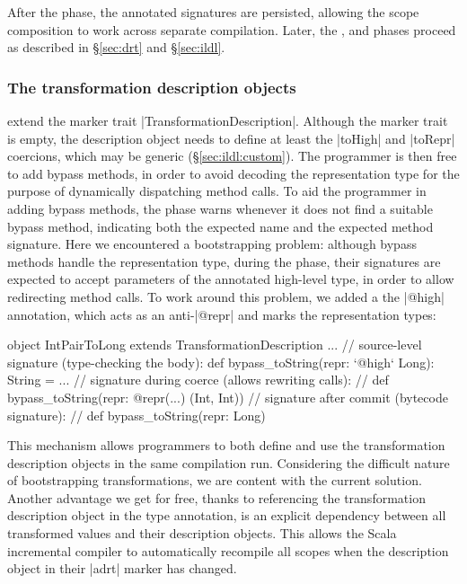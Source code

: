 \noindent
After the \inject{} phase, the annotated signatures are persisted, allowing the scope composition to work across separate compilation.
Later, the \bridge{}, \coerce{} and \commit{} phases proceed as described in \S\ref{sec:drt} and \S\ref{sec:ildl}.

\subsubsection{The transformation description objects} extend the marker trait |TransformationDescription|. Although the marker trait is empty, the description object needs to define at least the |toHigh| and |toRepr| coercions, which may be generic (\S\ref{sec:ildl:custom}). The programmer is then free to add bypass methods, in order to avoid decoding the representation type for the purpose of dynamically dispatching method calls. To aid the programmer in adding bypass methods, the \coerce{} phase warns
whenever it does not find a suitable bypass method, indicating both the expected name and the expected method signature. Here we encountered a bootstrapping problem: although bypass methods handle the representation type, during the \coerce{} phase, their signatures are expected to accept parameters of the annotated high-level type, in order to allow redirecting method calls. To work around this problem, we added a the |@high| annotation, which acts as an anti-|@repr| and marks the representation types:

\begin{lstlisting-nobreak}
object IntPairToLong extends TransformationDescription{
  ...
  // source-level signature (type-checking the body):
  def bypass_toString(repr: `@high` Long): String = ...
  // signature during coerce (allows rewriting calls):
  //   def bypass_toString(repr: @repr(...) (Int, Int))
  // signature after commit (bytecode signature):
  //   def bypass_toString(repr: Long)
}
\end{lstlisting-nobreak}

This mechanism allows programmers to both define and use the transformation description objects in the same compilation run. Considering the difficult nature of bootstrapping transformations, we are  content with the current solution.
Another advantage we get for free, thanks to referencing the transformation description object in the type annotation, is an explicit dependency between all transformed values and their description objects. This allows the Scala incremental compiler to automatically recompile all scopes when the description object in their |adrt| marker has changed.

